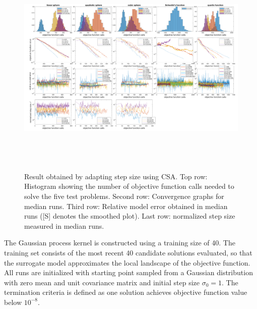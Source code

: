 \begin{center}
\begin{figure}
\includegraphics[height=4.2in, width=6in]{merged_plot_v4}
\caption
{Result obtained by adapting step size using CSA. Top row: Histogram showing the number of objective function calls needed to solve the five test problems. Second row: Convergence graphs for median runs. Third row: Relative model error obtained in median runs ([S] denotes the smoothed plot). Last row: normalized step size measured in median runs.
} 
\label{fig:merged_plot}
\end{figure}
\end{center}


The Gaussian process kernel is constructed using a training size of 40. The training set consists of the most recent 40 candidate solutions evaluated, so that the surrogate model approximates the local landscape of the objective function. All runs are initialized with starting point sampled from a Gaussian distribution with zero mean and unit covariance matrix and initial step size $\sigma_0=1$. The termination criteria is defined as one solution achieves objective function value below $10^{-8}$.

